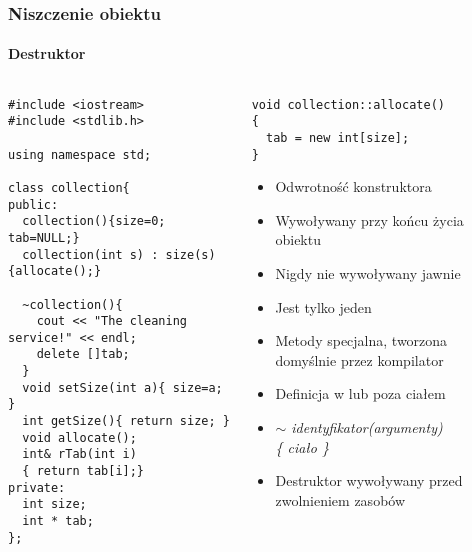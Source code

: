 \documentclass[10pt]{beamer}
\begin{document}
\begin{frame}[fragile]
  \frametitle{Niszczenie obiektu}
  \framesubtitle{Destruktor}
  \begin{columns}
    \begin{column}{0.48\textwidth}
\vspace{-0.2cm}
\begin{lstlisting}
#include <iostream>
#include <stdlib.h>

using namespace std;

class collection{
public:
  collection(){size=0; tab=NULL;}
  collection(int s) : size(s) {allocate();}

  ~collection(){
    cout << "The cleaning service!" << endl;
    delete []tab;
  }
  void setSize(int a){ size=a; }
  int getSize(){ return size; }
  void allocate();
  int& rTab(int i)
  { return tab[i];}
private:
  int size;
  int * tab;
};
\end{lstlisting}
    \end{column}
    \begin{column}{0.48\textwidth}
\begin{lstlisting}
void collection::allocate()
{
  tab = new int[size];
}
\end{lstlisting}
      \begin{itemize}
        \item Odwrotność konstruktora
        \item Wywoływany przy końcu życia obiektu
        \item Nigdy nie wywoływany jawnie
        \item Jest tylko jeden
        \item Metody specjalna, tworzona domyślnie przez kompilator
        \item Definicja w lub poza ciałem
        \item \textit{{$\sim$} identyfikator(argumenty)\\ \{ ciało \}}
        \item Destruktor wywoływany przed zwolnieniem zasobów
      \end{itemize}
    \end{column}
  \end{columns}
\end{frame}
\end{document}
